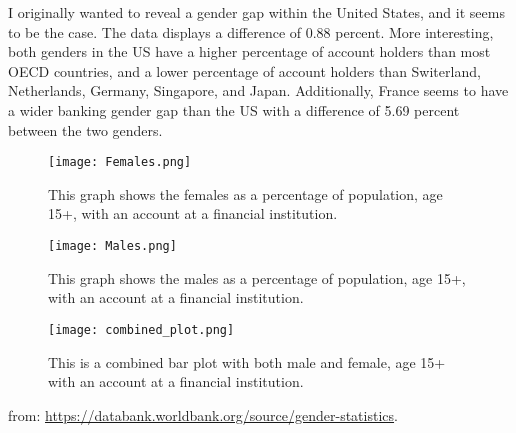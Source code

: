 \documentclass{article}
\begin{document}
I originally wanted to reveal a gender gap within the United States, and it seems to be the case. The data displays a difference of 0.88 percent. More interesting, both genders in the US have a higher percentage of account holders than most OECD countries, and a lower percentage of account holders than Switerland, Netherlands, Germany, Singapore, and Japan. 
Additionally, France seems to have a wider banking gender gap than the US with a difference of 5.69 percent between the two genders. 
\begin{figure}
\centering
\texttt{[image: Females.png]}
\caption{\label{fig:female}This graph shows the females as a percentage of population, age 15+, with an account at a financial institution. }
\end{figure}

\begin{figure}
\centering
\texttt{[image: Males.png]}
\caption{\label{fig:male}This graph shows the males as a percentage of population, age 15+, with an account at a financial institution.}
\end{figure}

\begin{figure}
\centering
\texttt{[image: combined\_plot.png]}
\caption{\label{fig:combined}This is a combined bar plot with both male and female, age 15+ with an account at a financial institution.}
\end{figure}
from:
 \url{https://databank.worldbank.org/source/gender-statistics}.
\end{document}
